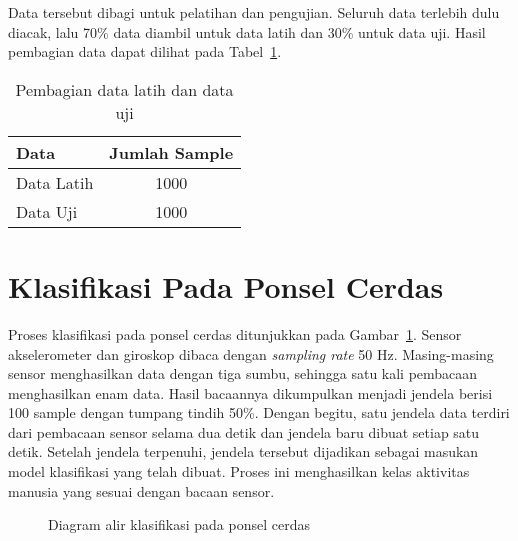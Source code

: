 Data tersebut dibagi untuk pelatihan dan pengujian. Seluruh data terlebih dulu diacak, lalu 70\% data diambil untuk data latih dan 30\% untuk data uji. Hasil pembagian data dapat dilihat pada Tabel~\ref{table:pembagian-data-latih-uji}.

\begin{table}[h!]
    \centering
    \caption{Pembagian data latih dan data uji}
    \begin{tabular}{ |l|c| }
        \hline
        \textbf{Data} & \textbf{Jumlah Sample} \\

        \hline
        Data Latih & 1000 \\

        \hline
        Data Uji & 1000 \\

        \hline
    \end{tabular}
    \label{table:pembagian-data-latih-uji}
\end{table}


\section{Klasifikasi Pada Ponsel Cerdas}
Proses klasifikasi pada ponsel cerdas ditunjukkan pada Gambar~\ref{gambar:diagram-alir-klasifikasi-ponsel-cerdas}. Sensor akselerometer dan giroskop dibaca dengan \textit{sampling rate} 50 Hz. Masing-masing sensor menghasilkan data dengan tiga sumbu, sehingga satu kali pembacaan menghasilkan enam data. Hasil bacaannya dikumpulkan menjadi jendela berisi 100 sample dengan tumpang tindih 50\%. Dengan begitu, satu jendela data terdiri dari pembacaan sensor selama dua detik dan jendela baru dibuat setiap satu detik. Setelah jendela terpenuhi, jendela tersebut dijadikan sebagai masukan model klasifikasi yang telah dibuat. Proses ini menghasilkan kelas aktivitas manusia yang sesuai dengan bacaan sensor.

\begin{figure}[h]
    \centering
    \caption{Diagram alir klasifikasi pada ponsel cerdas}
    \label{gambar:diagram-alir-klasifikasi-ponsel-cerdas}
\end{figure}

